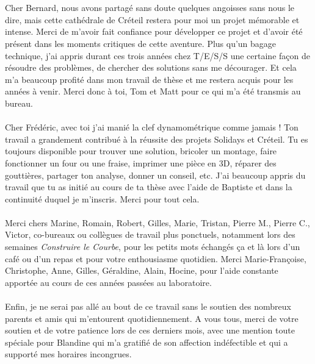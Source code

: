 \\
\\
Cher Bernard, nous avons partagé sans doute quelques angoisses sans nous le dire, mais cette cathédrale de Créteil restera pour moi un projet mémorable et intense. Merci de m'avoir fait confiance pour développer ce projet et d'avoir été présent dans les moments critiques de cette aventure. Plus qu'un bagage technique, j'ai appris durant ces trois années chez T/E/S/S une certaine façon de résoudre des problèmes, de chercher des solutions sans me décourager. Et cela m'a beaucoup profité dans mon travail de thèse et me restera acquis pour les années à venir. Merci donc à toi, Tom et Matt pour ce qui m'a été transmis au bureau.
\\
\\
Cher Frédéric, avec toi j'ai manié la clef dynamométrique comme jamais ! Ton travail a grandement contribué à la réussite des projets Solidays et Créteil. Tu es toujours disponible pour trouver une solution, bricoler un montage, faire fonctionner un four ou une fraise, imprimer une pièce en 3D, réparer des gouttières, partager ton analyse, donner un conseil, etc. J'ai beaucoup appris du travail que tu as initié au cours de ta thèse avec l'aide de Baptiste et dans la continuité duquel je m'inscris. Merci pour tout cela.
\\
\\
Merci chers Marine, Romain, Robert, Gilles, Marie, Tristan, Pierre M., Pierre C., Victor, \telp{} co-bureaux ou collègues de travail plus ponctuels, notamment lors des semaines \emph{Construire le Courbe}, pour les petits mots échangés ça et là lors d'un café ou d'un repas et pour votre enthousiasme quotidien. Merci Marie-Françoise, Christophe, Anne, Gilles, Géraldine, Alain, Hocine, pour l'aide constante apportée au cours de ces années passées au laboratoire.
\\
\\
Enfin, je ne serai pas allé au bout de ce travail sans le soutien des nombreux parents et amis qui m'entourent quotidiennement. A vous tous, merci de votre soutien et de votre patience lors de ces derniers mois, avec une mention toute spéciale pour Blandine qui m'a gratifié de son affection indéfectible et qui a supporté mes horaires incongrues.











